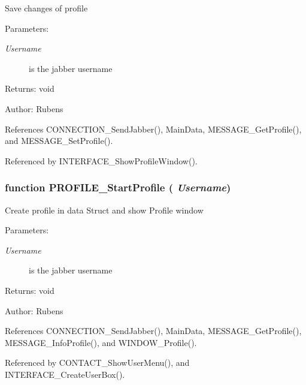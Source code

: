 Save changes of profile

\begin{Desc}
\item[Parameters:]
\begin{description}
\item[{\em Username}]is the jabber username \end{description}
\end{Desc}
\begin{Desc}
\item[Returns:]void \end{Desc}
\begin{Desc}
\item[Author:]Rubens \end{Desc}


References CONNECTION\_\-SendJabber(), MainData, MESSAGE\_\-GetProfile(), and MESSAGE\_\-SetProfile().

Referenced by INTERFACE\_\-ShowProfileWindow().
\subsubsection{\setlength{\rightskip}{0pt plus 5cm}function PROFILE\_\-StartProfile ( {\em Username})}\label{profile_2profile_8js_f78b5d430fb82f23ddc58faaf7ad182d}


Create profile in data Struct and show Profile window

\begin{Desc}
\item[Parameters:]
\begin{description}
\item[{\em Username}]is the jabber username \end{description}
\end{Desc}
\begin{Desc}
\item[Returns:]void \end{Desc}
\begin{Desc}
\item[Author:]Rubens \end{Desc}


References CONNECTION\_\-SendJabber(), MainData, MESSAGE\_\-GetProfile(), MESSAGE\_\-InfoProfile(), and WINDOW\_\-Profile().

Referenced by CONTACT\_\-ShowUserMenu(), and INTERFACE\_\-CreateUserBox().